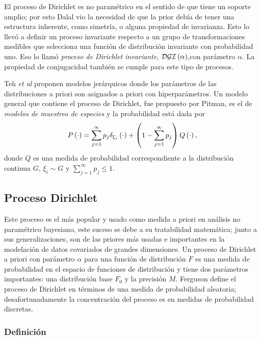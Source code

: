 El proceso de Dirichlet es no paramétrico en el sentido de que tiene un soporte amplio; por esto Dalal vio la necesidad de %
que la prior debía de tener una estructura inherente, como simetría, o alguna propiedad de invarianza. Esto lo llevó a %
definir un proceso invariante respecto a un grupo de transformaciones medibles que selecciona una función de distribución %
invariante con probabilidad uno. Eso lo llamó \textit{proceso de Dirichlet invariante}, $\mathcal{DGI}\left( \alpha \right)$,con parámetro %
$\alpha$. La propiedad de conjugacidad también se cumple para este tipo de procesos.

Teh \textit{et al} proponen modelos jerárquicos donde los parámetros de las distribuciones a priori son asignados a priori %
con hiperparámetros. Un modelo general que contiene el proceso de Dirichlet, fue propuesto por Pitman, es el de \textit{modelos %
de muestreo de especies} y la probabilidad está dada por
\[
P\left( \cdot \right) = \sum_{j = 1}^{\infty} p_{j} \delta_{\xi_{j}}\left( \cdot \right) + 
            \left( 1 - \sum_{j = 1}^{\infty} p_{j} \right) Q\left( \cdot \right),
\]
donde $Q$ es una medida de probabilidad correspondiente a la distribución continua $G$, $\xi_{i} \sim G$ y $\sum_{j = 1}^%
{\infty} p_{j} \leq 1$.


\subsection{Proceso Dirichlet}

Este proceso es el más popular y usado como medida a priori en análisis no paramétrico bayesiano, este suceso se debe a su %
tratabilidad matemática; junto a sus generalizaciones, son de las priores más usadas e importantes en la modelación de %
datos covariados de grandes dimensiones. Un proceso de Dirichlet a priori con parámetro $\alpha$ para una función de %
distribución $F$ es una medida de probabilidad en el espacio de funciones de distribución y tiene dos parámetros importantes: %
una distribución base $F_{0}$ y la precisión $M$. Ferguson define el proceso de Dirichlet en términos de una medida de %
probabilidad aleatoria; desafortunadamente la concentración del proceso es en medidas de probabilidad discretas.

\subsubsection{Definición}

